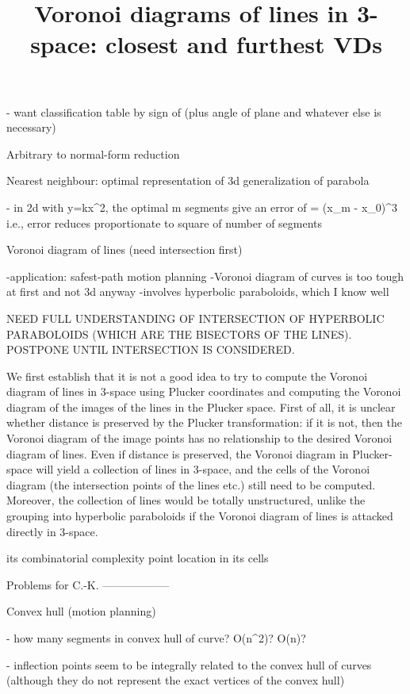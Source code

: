 	- want classification table by sign of \alpha (plus angle of plane
	  and whatever else is necessary)

Arbitrary to normal-form reduction

Nearest neighbour: optimal representation of 
		   3d generalization of parabola 

	- in 2d with y=kx^{2}, the optimal m segments give an error
	  of \epsilon =  (x_{m} - x_{0})^{3}
	     i.e., error reduces proportionate to 
		   square of number of segments


Voronoi diagram of lines (need intersection first)

	-application: safest-path motion planning
	-Voronoi diagram of curves is too tough at first
	 and not 3d anyway
	-involves hyperbolic paraboloids, which I know well

\title{Voronoi diagrams of lines in 3-space: closest and furthest VDs}

NEED FULL UNDERSTANDING OF INTERSECTION OF HYPERBOLIC PARABOLOIDS
(WHICH ARE THE BISECTORS OF THE LINES).
POSTPONE UNTIL INTERSECTION IS CONSIDERED.

We first establish that it is not a good idea 
to try to compute the Voronoi diagram of lines in 
3-space using Plucker coordinates and computing the Voronoi diagram
of the images of the lines in the Plucker space.
First of all, it is unclear whether distance is preserved by the Plucker
transformation: if it is not, then the Voronoi diagram of the image points
has no relationship to the desired Voronoi diagram of lines.
Even if distance is preserved, 
the Voronoi diagram in Plucker-space will yield a collection of lines
in 3-space, and the cells of the Voronoi diagram (the intersection points
of the lines etc.) still need to be computed.
Moreover, the collection of lines would be totally unstructured,
unlike the grouping into hyperbolic paraboloids if the Voronoi diagram
of lines is attacked directly in 3-space.

its combinatorial complexity 
point location in its cells


Problems for C.-K.
------------------

Convex hull (motion planning)

	- how many segments in convex hull of curve?
			O(n^{2})?
			O(n)?

	- inflection points seem to be integrally related to the
	  convex hull of curves (although they do not represent
	  the exact vertices of the convex hull)

